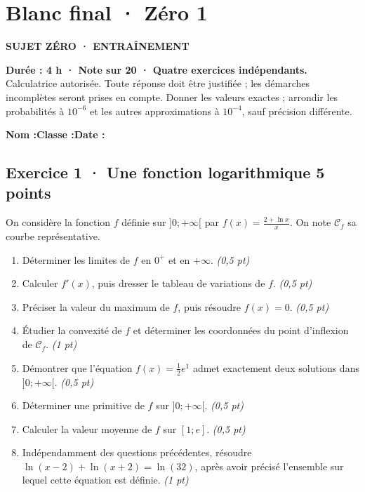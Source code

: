 \clearpage{}\label{sujet:9-1}

\section*{Blanc final · Zéro 1}

{\sffamily\bfseries\color{teal}SUJET ZÉRO · ENTRAÎNEMENT\par}

\textbf{Durée : 4 h · Note sur 20 · Quatre exercices indépendants.}\\Calculatrice autorisée. Toute réponse doit être justifiée ; les démarches incomplètes seront prises en compte. Donner les valeurs exactes ; arrondir les probabilités à $10^{-6}$ et les autres approximations à $10^{-4}$, sauf précision différente.

\smallskip\textbf{Nom :}\enspace\dotfill\quad\textbf{Classe :}\enspace\dotfill\quad\textbf{Date :}\enspace\dotfill

\subsection*{Exercice 1 · Une fonction logarithmique \hfill 5 points}On considère la fonction $f$ définie sur $]0;+\infty[$ par $f(x)=\frac{2+\ln x}x$. On note $\mathcal C_f$ sa courbe représentative.

\begin{enumerate}

\item Déterminer les limites de $f$ en $0^+$ et en $+\infty$. \hfill\textit{(0,5 pt)}

\item Calculer $f' (x)$, puis dresser le tableau de variations de $f$. \hfill\textit{(0,5 pt)}

\item Préciser la valeur du maximum de $f$, puis résoudre $f(x)=0$. \hfill\textit{(0,5 pt)}

\item Étudier la convexité de $f$ et déterminer les coordonnées du point d'inflexion de $\mathcal C_f$. \hfill\textit{(1 pt)}

\item Démontrer que l'équation $f(x)=\frac12 e^{1}$ admet exactement deux solutions dans $]0;+\infty[$. \hfill\textit{(0,5 pt)}

\item Déterminer une primitive de $f$ sur $]0;+\infty[$. \hfill\textit{(0,5 pt)}

\item Calculer la valeur moyenne de $f$ sur $[1;e]$. \hfill\textit{(0,5 pt)}

\item Indépendamment des questions précédentes, résoudre $\ln(x-2)+\ln(x+2)=\ln(32)$, après avoir précisé l'ensemble sur lequel cette équation est définie. \hfill\textit{(1 pt)}

\end{enumerate}

